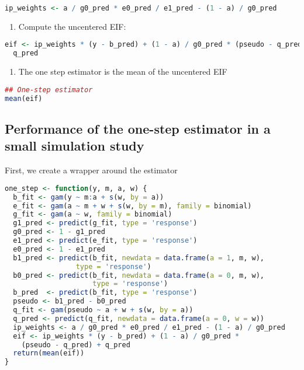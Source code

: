 \documentclass[
  12pt,
]{book}
\providecommand{\tightlist}{%
  \setlength{\itemsep}{0pt}\setlength{\parskip}{0pt}}
\theoremstyle{definition}
\theoremstyle{definition}
\theoremstyle{definition}
\newcommand{\1}{\mathbbm{1}}
\begin{document}
\begin{lstlisting}[language=R]
ip_weights <- a / g0_pred * e0_pred / e1_pred - (1 - a) / g0_pred
\end{lstlisting}

\begin{enumerate}
\def\labelenumi{\arabic{enumi}.}
\setcounter{enumi}{4}
\tightlist
\item
  Compute the uncentered EIF:
\end{enumerate}

\begin{lstlisting}[language=R]
eif <- ip_weights * (y - b_pred) + (1 - a) / g0_pred * (pseudo - q_pred) +
  q_pred
\end{lstlisting}

\begin{enumerate}
\def\labelenumi{\arabic{enumi}.}
\setcounter{enumi}{5}
\tightlist
\item
  The one step estimator is the mean of the uncentered EIF
\end{enumerate}

\begin{lstlisting}[language=R]
## One-step estimator
mean(eif)
\end{lstlisting}

\hypertarget{performance-of-the-one-step-estimator-in-a-small-simulation-study}{%
\subsection{Performance of the one-step estimator in a small simulation study}\label{performance-of-the-one-step-estimator-in-a-small-simulation-study}}

First, we create a wrapper around the estimator

\begin{lstlisting}[language=R]
one_step <- function(y, m, a, w) {
  b_fit <- gam(y ~ m:a + s(w, by = a))
  e_fit <- gam(a ~ m + w + s(w, by = m), family = binomial)
  g_fit <- gam(a ~ w, family = binomial)
  g1_pred <- predict(g_fit, type = 'response')
  g0_pred <- 1 - g1_pred
  e1_pred <- predict(e_fit, type = 'response')
  e0_pred <- 1 - e1_pred
  b1_pred <- predict(b_fit, newdata = data.frame(a = 1, m, w),
                 type = 'response')
  b0_pred <- predict(b_fit, newdata = data.frame(a = 0, m, w),
                     type = 'response')
  b_pred  <- predict(b_fit, type = 'response')
  pseudo <- b1_pred - b0_pred
  q_fit <- gam(pseudo ~ a + w + s(w, by = a))
  q_pred <- predict(q_fit, newdata = data.frame(a = 0, w = w))
  ip_weights <- a / g0_pred * e0_pred / e1_pred - (1 - a) / g0_pred
  eif <- ip_weights * (y - b_pred) + (1 - a) / g0_pred *
    (pseudo - q_pred) + q_pred
  return(mean(eif))
}
\end{lstlisting}
\end{document}
